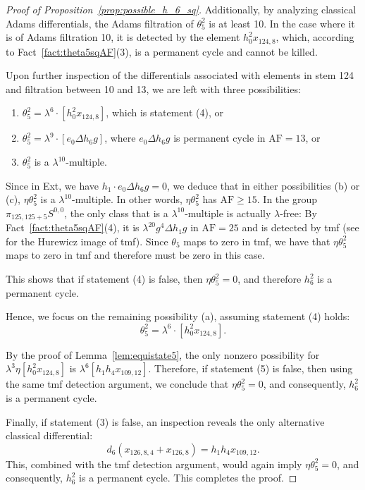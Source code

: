 \documentclass{amsart}
\numberwithin{equation}{section}
\newcommand{\AF}{\mathrm{AF}}
\begin{document}
\begin{proof}[Proof of Proposition~\ref{prop:possible_h_6_sq}]
Additionally, by analyzing classical Adams differentials, the Adams filtration of $\theta_5^2$ is at least 10. In the case where it is of Adams filtration 10, it is detected by the element $h_0^2 x_{124,8}$, which, according to Fact~\ref{fact:theta5sqAF}(3), is a permanent cycle and cannot be killed. 

Upon further inspection of the differentials associated with elements in stem 124 and filtration between 10 and 13, we are left with three possibilities:
\begin{enumerate}[label=(\alph*)]
    \item $\theta_5^2 = \lambda^6 \cdot [h_0^2 x_{124,8}]$, which is statement (4), or
    \item $\theta_5^2 = \lambda^9 \cdot [e_0 \Delta h_6 g]$, where $e_0 \Delta h_6 g$ is permanent cycle in $\AF=13$, or
    \item $\theta_5^2$ is a $\lambda^{10}$-multiple.
\end{enumerate}

Since in Ext, we have $h_1 \cdot e_0 \Delta h_6 g = 0$, we deduce that in either possibilities (b) or (c), $\eta \theta_5^2$ is a $\lambda^{10}$-multiple. In other words, $\eta \theta_5^2$ has $\AF \ge 15$. In the group $\pi_{125,125+5} S^{0,0}$, the only class that is a $\lambda^{10}$-multiple is actually $\lambda$-free: By Fact~\ref{fact:theta5sqAF}(4), it is $\lambda^{20} g^4 \Delta h_1 g$ in $\AF=25$ and is detected by tmf (see \cite{tmf} for the Hurewicz image of tmf). Since $\theta_5$ maps to zero in tmf, we have that $\eta \theta_5^2$ maps to zero in tmf and therefore must be zero in this case. 

This shows that if statement (4) is false, then $\eta \theta_5^2 = 0$, and therefore $h_6^2$ is a permanent cycle.

Hence, we focus on the remaining possibility (a), assuming statement (4) holds:
$$\theta_5^2 = \lambda^6 \cdot [h_0^2 x_{124,8}].$$

By the proof of Lemma~\ref{lem:equistate5}, the only nonzero possibility for $\lambda^3 \eta [h_0^2x_{124,8}]$ is $\lambda^6 [h_1h_4x_{109,12}]$. Therefore, if statement (5) is false, then using the same tmf detection argument, we conclude that $\eta \theta_5^2 = 0$, and consequently, $h_6^2$ is a permanent cycle.

Finally, if statement (3) is false, an inspection reveals the only alternative classical differential:
$$d_6(x_{126,8,4} + x_{126,8}) = h_1h_4x_{109,12}.$$
This, combined with the tmf detection argument, would again imply $\eta \theta_5^2 = 0$, and consequently, $h_6^2$ is a permanent cycle. This completes the proof.
\end{proof}
\end{document}
